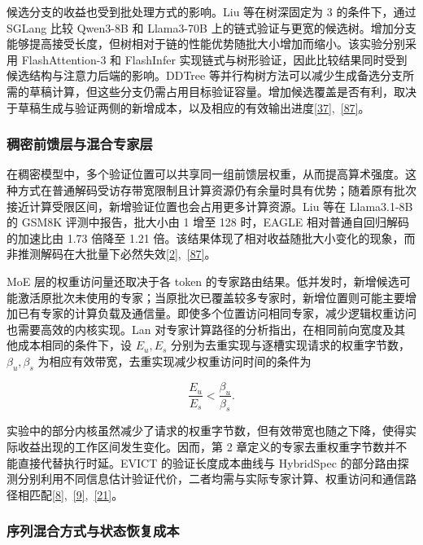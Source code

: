 \documentclass[11pt,a4paper,UTF8,fontset=none,scheme=plain,zihao=-4]{ctexart}
\begin{document}
候选分支的收益也受到批处理方式的影响。Liu 等在树深固定为 3
的条件下，通过 SGLang 比较 Qwen3-8B 和 Llama3-70B
上的链式验证与更宽的候选树。增加分支能够提高接受长度，但树相对于链的性能优势随批大小增加而缩小。该实验分别采用
FlashAttention-3 和 FlashInfer
实现链式与树形验证，因此比较结果同时受到候选结构与注意力后端的影响。DDTree
等并行构树方法可以减少生成备选分支所需的草稿计算，但这些分支仍需占用目标验证容量。增加候选覆盖是否有利，取决于草稿生成与验证两侧的新增成本，以及相应的有效输出进度\protect\hyperlink{ref-ddtree}{{[}37{]}},~\protect\hyperlink{ref-illusion}{{[}87{]}}。

\hypertarget{section-7-1-2}{%
\subsubsection{稠密前馈层与混合专家层}\label{section-7-1-2}}

在稠密模型中，多个验证位置可以共享同一组前馈层权重，从而提高算术强度。这种方式在普通解码受访存带宽限制且计算资源仍有余量时具有优势；随着原有批次接近计算受限区间，新增验证位置也会占用更多计算资源。Liu
等在 Llama3.1-8B 的 GSM8K 评测中报告，批大小由 1 增至 128 时，EAGLE
相对普通自回归解码的加速比由 1.73 倍降至 1.21
倍。该结果体现了相对收益随批大小变化的现象，而非推测解码在大批量下必然失效\protect\hyperlink{ref-magicdec}{{[}2{]}},~\protect\hyperlink{ref-illusion}{{[}87{]}}。

MoE 层的权重访问量还取决于各 token
的专家路由结果。低并发时，新增候选可能激活原批次未使用的专家；当原批次已覆盖较多专家时，新增位置则可能主要增加已有专家的计算负载及通信量。即使多个位置访问相同专家，减少逻辑权重访问也需要高效的内核实现。Lan
对专家计算路径的分析指出，在相同前向宽度及其他成本相同的条件下，设
\(E_u,E_s\)
分别为去重实现与逐槽实现请求的权重字节数，\(\beta_u,\beta_s\)
为相应有效带宽，去重实现减少权重访问时间的条件为

\[
\frac{E_u}{E_s}<\frac{\beta_u}{\beta_s}.
\]

实验中的部分内核虽然减少了请求的权重字节数，但有效带宽也随之下降，使得实际收益出现的工作区间发生变化。因而，第
2 章定义的专家去重权重字节数并不能直接代替执行时延。EVICT
的验证长度成本曲线与 HybridSpec
的部分路由探测分别利用不同信息估计验证代价，二者均需与实际专家计算、权重访问和通信路径相匹配\protect\hyperlink{ref-evict}{{[}8{]}},~\protect\hyperlink{ref-hybridspec}{{[}9{]}},~\protect\hyperlink{ref-moebytes}{{[}21{]}}。

\hypertarget{section-7-1-3}{%
\subsubsection{序列混合方式与状态恢复成本}\label{section-7-1-3}}
\end{document}
